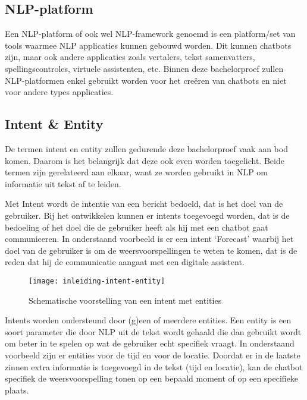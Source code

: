 \subsection{NLP-platform}
\label{subsec:begrippen-nlp-platform}

Een NLP-platform of ook wel NLP-framework genoemd is een platform/set van tools waarmee NLP applicaties kunnen gebouwd worden. Dit kunnen chatbots zijn, maar ook andere applicaties zoals vertalers, tekst samenvatters, spellingscontroles, virtuele assistenten, etc. Binnen deze bachelorproef zullen NLP-platformen enkel gebruikt worden voor het creëren van chatbots en niet voor andere types applicaties.

\subsection{Intent \& Entity}
\label{subsec:begrippen-intent-entity}

De termen intent en entity zullen gedurende deze bachelorproef vaak aan bod komen. Daarom is het belangrijk dat deze ook even worden toegelicht. Beide termen zijn gerelateerd aan elkaar, want ze worden gebruikt in NLP om informatie uit tekst af te leiden.

Met Intent wordt de intentie van een bericht bedoeld, dat is het doel van de gebruiker. Bij het ontwikkelen kunnen er intents toegevoegd worden, dat is de bedoeling of het doel die de gebruiker heeft als hij met een chatbot gaat communiceren. In onderstaand voorbeeld is er een intent ‘Forecast’ waarbij het doel van de gebruiker is om de weersvoorspellingen te weten te komen, dat is de reden dat hij de communicatie aangaat met een digitale assistent.

\begin{figure}[!htbp]
    \label{fig:inleiding-intent-entity}
    \centering
    \texttt{[image: inleiding-intent-entity]}
    \caption{Schematische voorstelling van een intent met entities \autocite{GoogleCloud2020}}
\end{figure}

Intents worden ondersteund door (g)een of meerdere entities. Een entity is een soort parameter die door NLP uit de tekst wordt gehaald die dan gebruikt wordt om beter in te spelen op wat de gebruiker echt specifiek vraagt. In onderstaand voorbeeld zijn er entities voor de tijd en voor de locatie. Doordat er in de laatste zinnen extra informatie is toegevoegd in de tekst (tijd en locatie), kan de chatbot specifiek de weersvoorspelling tonen op een bepaald moment of op een specifieke plaats.

